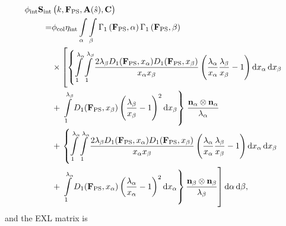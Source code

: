 \begin{equation} \label{eq:fullinteractions}
\begin{split}
\phi_\mathrm{int}\mathbf{S}_\mathrm{int}&\left(k , \mathbf{F}_\mathrm{PS}, \mathbf{A}(\hat{s}), \mathbf{C}\right) \\
=& \phi_\mathrm{col} \eta_\mathrm{int} \int\displaylimits_\alpha \int\displaylimits_\beta \Gamma_1 \left(\mathbf{F}_\mathrm{PS}, \alpha \right) \Gamma_1 \left(\mathbf{F}_\mathrm{PS},  \beta \right) \\
&\times\left[ \left\lbrace 
\int\displaylimits_1^{\lambda_\alpha} \int\displaylimits_1^{\lambda_\beta} 
\frac{2 \lambda_\beta D_1(\mathbf{F}_\mathrm{PS}, x_\alpha) D_1(\mathbf{F}_\mathrm{PS}, x_\beta)}{x_\alpha x_\beta} 
\left( \frac{\lambda_\alpha}{x_\alpha} \frac{\lambda_\beta}{x_\beta} - 1\right) \mathrm{d}x_\alpha \, \mathrm{d}x_\beta \right.\right. \\
&+ \left. \left. \int\displaylimits_1^{\lambda_\beta} D_1(\mathbf{F}_\mathrm{PS}, x_\beta) \left( \frac{\lambda_\beta}{x_\beta} -1  \right)^2 \mathrm{d}x_\beta \right\rbrace \right.  \frac{\mathbf{n}_\alpha \otimes \mathbf{n}_\alpha}{\lambda_\alpha}  \\
&+ \left. \left\lbrace
\int\displaylimits_1^{\lambda_\alpha} \int\displaylimits_1^{\lambda_\alpha} 
\frac{2 \lambda_\beta D_1(\mathbf{F}_\mathrm{PS}, x_\alpha) D_1(\mathbf{F}_\mathrm{PS}, x_\beta)}{x_\alpha x_\beta} 
\left( \frac{\lambda_\alpha}{x_\alpha} \frac{\lambda_\beta}{x_\beta} - 1\right) \mathrm{d}x_\alpha \, \mathrm{d}x_\beta 
\right. \right. \\
&+\left. \left. \int\displaylimits_1^{\lambda_\alpha} D_1(\mathbf{F}_\mathrm{PS}, x_\alpha) \left( \frac{\lambda_\alpha}{x_\alpha} -1  \right)^2 \mathrm{d}x_\alpha \right\rbrace \frac{\mathbf{n}_\beta \otimes \mathbf{n}_\beta}{\lambda_\beta}  \right] \mathrm{d}\alpha \, \mathrm{d}\beta,
\end{split}
\end{equation}
and the EXL matrix is
